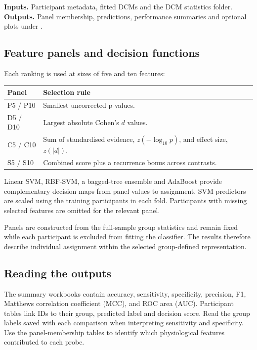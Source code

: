 \documentclass[11pt,a4paper]{article}
\newcommand{\code}[1]{\texttt{\detokenize{#1}}}
\begin{document}
\textbf{Inputs.} Participant metadata, fitted DCMs and the DCM statistics folder. \textbf{Outputs.} Panel membership, predictions, performance summaries and optional plots under \code{results/dcm_probe}.

\subsection*{Feature panels and decision functions}
Each ranking is used at sizes of five and ten features:
\begin{center}\small
\begin{tabular}{L{30mm}L{124mm}}\toprule
Panel & Selection rule\\\midrule
P5 / P10 & Smallest uncorrected p-values.\\
D5 / D10 & Largest absolute Cohen's $d$ values.\\
C5 / C10 & Sum of standardised evidence, $z(-\log_{10}p)$, and effect size, $z(|d|)$.\\
S5 / S10 & Combined score plus a recurrence bonus across contrasts.\\\bottomrule
\end{tabular}
\end{center}

Linear SVM, RBF-SVM, a bagged-tree ensemble and AdaBoost provide complementary decision maps from panel values to assignment. SVM predictors are scaled using the training participants in each fold. Participants with missing selected features are omitted for the relevant panel.

Panels are constructed from the full-sample group statistics and remain fixed while each participant is excluded from fitting the classifier. The results therefore describe individual assignment within the selected group-defined representation.

\subsection*{Reading the outputs}
The summary workbooks contain accuracy, sensitivity, specificity, precision, F1, Matthews correlation coefficient (MCC), and ROC area (AUC). Participant tables link IDs to their group, predicted label and decision score. Read the group labels saved with each comparison when interpreting sensitivity and specificity. Use the panel-membership tables to identify which physiological features contributed to each probe.
\end{document}
